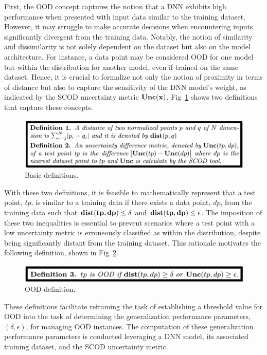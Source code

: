 First, the OOD concept captures the notion that a DNN exhibits high performance when presented with input data similar to the training dataset. However, it may struggle to make accurate decisions when encountering inputs significantly divergent from the training data. Notably, the notion of similarity and dissimilarity is not solely dependent on the dataset but also on the model architecture. For instance, a data point may be considered OOD for one model but within the distribution for another model, even if trained on the same dataset. Hence, it is crucial to formalize not only the notion of proximity in terms of distance but also to capture the sensitivity of the DNN model's weight, as indicated by the SCOD uncertainty metric $\bf{Unc}(x)$. Fig~\ref{fig:Bd} shows two definitions that capture these concepts.
\begin{figure}[ht]
\centering
\includegraphics[scale=0.65]{Fig/OOD_def.png}
\caption{Basic definitions.}
\label{fig:Bd}
\end{figure}
With these two definitions, it is feasible to mathematically represent that a test point, $tp$, is similar to a training data if there exists a data point, $dp$, from the training data such that $\bf{dist}(tp, dp) \leq \delta$ and $\bf{dist}(tp, dp) \leq \epsilon$. The imposition of these two inequalities is essential to prevent scenarios where a test point with a low uncertainty metric is erroneously classified as within the distribution, despite being significantly distant from the training dataset. This rationale motivates the following definition, shown in Fig~\ref{fig:OOD}. 
\begin{figure}[ht]
\centering
\includegraphics[scale=0.75]{Fig/OOD_def2.png}
\caption{OOD definition.}
\label{fig:OOD}
\end{figure}
These definitions facilitate reframing the task of establishing a threshold value for OOD into the task of determining the generalization performance parameters, $(\delta,\epsilon)$, for managing OOD instances. The computation of these generalization performance parameters is conducted leveraging a DNN model, its associated training dataset, and the SCOD uncertainty metric. 
 
